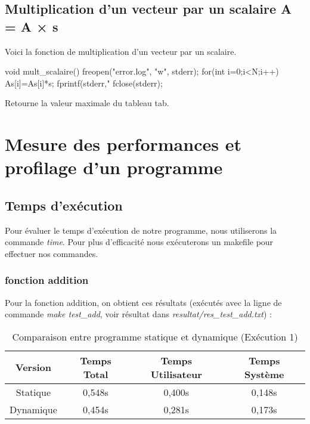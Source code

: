 \documentclass{rapport}
\begin{document}
      \subsection{Multiplication d’un vecteur par un scalaire A = A × s}
        Voici la fonction de multiplication d'un vecteur par un scalaire.
        \begin{algorithm}
        \begin{C}
void mult_scalaire(){
    freopen("error.log", "w", stderr);
    for(int i=0;i<N;i++){
        As[i]=As[i]*s;
        fprintf(stderr,"%
    }
    fclose(stderr);
}
        \end{C}
        \caption[Algo en C]{Retourne la valeur maximale du tableau tab.}
      \end{algorithm}
    
    \section{Mesure des performances et profilage d’un programme}
    \subsection{Temps d'exécution}
      Pour évaluer le temps d'exécution de notre programme, nous utiliserons la commande \textit{time}.
      Pour plus d'efficacité nous exécuterons un makefile pour effectuer nos commandes.
      
    \subsubsection{fonction addition}
      Pour la fonction addition, on obtient ces résultats (exécutés avec la ligne de commande \textit{make test\_add}, voir résultat dans \textit{resultat/res\_test\_add.txt}) :
     
    \begin{table}[h!]
    \centering
    \begin{tabular}{|c|c|c|c|}
        \hline
        Version & Temps Total & Temps Utilisateur & Temps Système \\
        \hline
        Statique & 0,548s & 0,400s & 0,148s \\
        \hline
        Dynamique & 0,454s & 0,281s & 0,173s \\
        \hline
    \end{tabular}
    \caption{Comparaison entre programme statique et dynamique (Exécution 1)}
\end{table}
\end{document}
